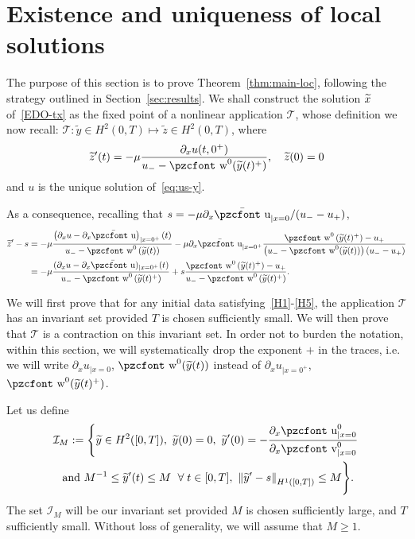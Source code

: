 \documentclass[10pt]{amsart}
\theoremstyle{definition}\newtheorem{defi}[theo]{Definition}\newtheorem{rema}[theo]{Remark}\newtheorem{exam}[theo]{Example}\newtheorem{exem}[theo]{Example}\newtheorem{nota}[theo]{Notation}
\newcommand{\mathpzc}[1]{\text{\pzcfont #1}}
\newcommand{\p}{\partial}
\newcommand{\bu}{\bar{\mathpzc{u}}}
\newcommand{\cT}{\mathcal T}
\newcommand{\cI}{\mathcal I}
\newcommand{\tv}{\mathpzc{v}}
\newcommand{\tu}{\mathpzc{u}}
\newcommand{\tw}{\mathpzc{w}}
\newcommand{\ty}{\widetilde{y}}
\newcommand{\tz}{\widetilde{z}}
\let\oldtilde\tilde
\renewcommand*{\tilde}[1]{\mathchoice{\widetilde{#1}}{\widetilde{#1}}{\oldtilde{#1}}{\oldtilde{#1}}}
\let\oldforall\forall
\renewcommand*{\forall}{\mathrel{\oldforall}}
\begin{document}
\section{Existence and uniqueness of local solutions}\label{sec:local}

The purpose of this section is to prove Theorem~\ref{thm:main-loc}, following the strategy outlined in Section~\ref{sec:results}. We shall construct the solution $\tilde x$ of~\eqref{EDO-tx} as the fixed point of a nonlinear application $\cT$, whose definition we now recall: $\cT: \ty\in H^2(0,T) \mapsto \tz\in H^2(0,T)$, where
\[
\tilde z'(t) =-\mu \frac{ \p_x u(t, 0^+)}{u_- - \tw^0(\tilde y(t)^+)},\quad \tz(0)=0
\]
and $u$ is the unique solution of~\eqref{eq:us-y}.


As a consequence, recalling that $s=-\mu \p_x \bu_{|x=0}/(u_--u_+)$,
\begin{equation}\label{y'-s}
\begin{split}
\tilde z' - s & = -\mu \frac{\left(\p_x u - \p_x \bu\right)_{|x=0^+}(t)}{u_--\tw^0\left(\ty(t)\right)} - \mu \partial_x \bu_{|x=0^+} \dfrac{\tw^0\left(\ty(t)^+\right) - u_+}{\left(u_- - \tw^0(\ty(t))\right) (u_- -u_+)} \\
& = -\mu \frac{(\p_x u - \p_x \bu)_{|x=0^+}(t)}{u_--\tw^0\left(\ty(t)^+\right)} + s \frac{\tw^0\left(\ty(t)^+\right) - u_+}{u_--\tw^0\left(\ty(t)^+\right)}.
\end{split}
\end{equation}



We will first prove that for any initial data satisfying~\eqref{H1}-\eqref{H5}, the application $\cT$ has an invariant set provided $T$ is chosen sufficiently small. We will then prove that $\cT$ is a contraction on this invariant set. {In order not to burden the notation, within this section, we will systematically drop the exponent $+$ in the traces, i.e. we will write $\p_x u_{|x=0}$, $\tw^0(\ty(t))$ instead of $\p_x u_{|x=0^+}$, $\tw^0(\ty(t)^+)$. }


Let us define
\begin{multline*}
\cI_M :=\left\{\ty\in H^2([0,T]),\ \ty(0)=0, \ \ty'(0)=-\frac{\p_x \tu^0_{|x=0}}{\p_x \tv^0_{|x=0}}\right.\\\text{ and } M^{-1} \leq \ty'(t)\leq M \ \forall t\in [0,T],
\ \left\|\ty'-s\right\|_{H^1([0,T])}\leq M\Bigg\}.
\end{multline*}
The set $\cI_M$ will be our invariant set provided $M$ is chosen sufficiently large, and $T$ sufficiently small. Without loss of generality, we will assume that $M \geq 1$.
\end{document}
